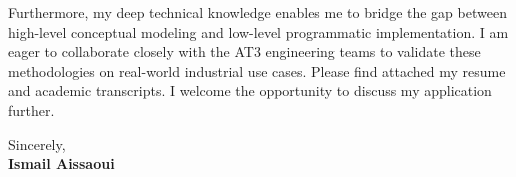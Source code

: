 \documentclass[11pt,a4paper]{article}
\begin{document}
\vspace{0.5em}
\noindent
Furthermore, my deep technical knowledge enables me to bridge the gap between high-level conceptual modeling and low-level programmatic implementation. I am eager to collaborate closely with the AT3 engineering teams to validate these methodologies on real-world industrial use cases. Please find attached my resume and academic transcripts. I welcome the opportunity to discuss my application further.

\vspace{1.5em}
\noindent
Sincerely, \\[0.5em]
\textbf{Ismail Aissaoui}
\end{document}
